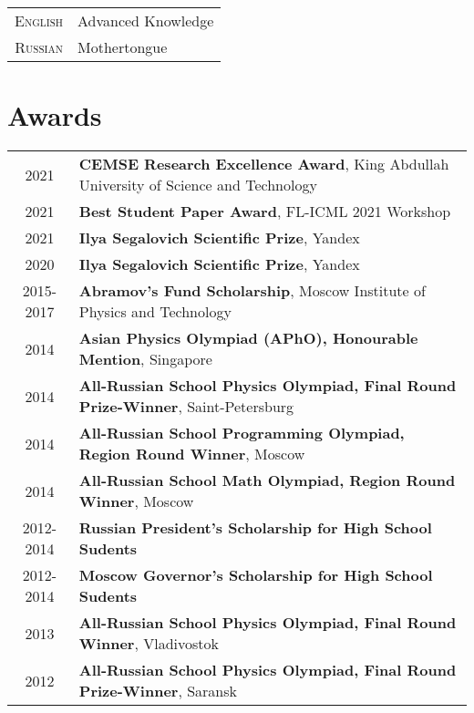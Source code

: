 \documentclass[a4paper,10pt]{article} %
\begin{document}
\begin{tabular}{rl}
\textsc{English} & Advanced Knowledge \\
\textsc{Russian} & Mothertongue\\
\end{tabular}

\section{Awards}

%	
%
%
%
%
%
%

\begin{tabular}{cl}
	\textsc{2021} & \textbf{CEMSE Research Excellence Award}, King Abdullah University of Science and Technology\\
	\textsc{2021} & \textbf{Best Student Paper Award}, FL-ICML 2021 Workshop\\
	\textsc{2021} & \textbf{Ilya Segalovich Scientific Prize}, Yandex \\
	\textsc{2020} & \textbf{Ilya Segalovich Scientific Prize}, Yandex\\
	\textsc{2015-2017} & \textbf{Abramov’s Fund Scholarship}, Moscow Institute of Physics and Technology\\
	\textsc{2014} & \textbf{Asian Physics Olympiad (APhO), Honourable Mention}, Singapore\\
	\textsc{2014} & \textbf{All-Russian School Physics Olympiad, Final Round Prize-Winner}, Saint-Petersburg\\
	\textsc{2014} & \textbf{All-Russian School Programming Olympiad, Region Round Winner}, Moscow\\
	\textsc{2014} & \textbf{All-Russian School Math Olympiad, Region Round Winner}, Moscow\\
	\textsc{2012-2014} & \textbf{Russian President’s Scholarship for High School Sudents}\\
	\textsc{2012-2014} & \textbf{Moscow Governor’s Scholarship for High School Sudents}\\
	\textsc{2013} & \textbf{All-Russian School Physics Olympiad, Final Round Winner}, Vladivostok\\
	\textsc{2012} & \textbf{All-Russian School Physics Olympiad, Final Round Prize-Winner}, Saransk\\
\end{tabular}
\end{document}
